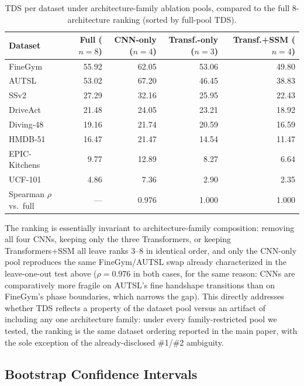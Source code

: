 \documentclass[a4paper, 10pt, conference, onecolumn]{ieeeconf}
\newcommand{\tabtight}{\setlength{\tabcolsep}{3.5pt}\renewcommand{\arraystretch}{1.12}}
\newcommand{\TDS}{\textsc{TDS}}
\begin{document}
\begin{table}[!htbp]
\centering
\caption{\TDS{} per dataset under architecture-family ablation pools, compared to the full 8-architecture ranking (sorted by full-pool \TDS{}).}
\label{tab:family_ablation}
\scriptsize\tabtight
\begin{tabular}{l r r r r}
\toprule
Dataset & Full ($n{=}8$) & CNN-only ($n{=}4$) & Transf.-only ($n{=}3$) & Transf.+SSM ($n{=}4$) \\
\midrule
FineGym       & 55.92 & 62.05 & 53.06 & 49.80 \\
AUTSL         & 53.02 & 67.20 & 46.45 & 38.83 \\
SSv2          & 27.29 & 32.16 & 25.95 & 22.43 \\
DriveAct      & 21.48 & 24.05 & 23.21 & 18.92 \\
Diving-48     & 19.16 & 21.74 & 20.59 & 16.59 \\
HMDB-51       & 16.47 & 21.47 & 14.54 & 11.47 \\
EPIC-Kitchens &  9.77 & 12.89 &  8.27 &  6.64 \\
UCF-101       &  4.86 &  7.36 &  2.90 &  2.35 \\
\midrule
Spearman $\rho$ vs.\ full & --- & 0.976 & 1.000 & 1.000 \\
\bottomrule
\end{tabular}
\end{table}

The ranking is essentially invariant to architecture-family composition: removing all four CNNs, keeping only the three Transformers, or keeping Transformers+SSM all leave ranks 3--8 in identical order, and only the CNN-only pool reproduces the same FineGym/AUTSL swap already characterized in the leave-one-out test above ($\rho=0.976$ in both cases, for the same reason: CNNs are comparatively more fragile on AUTSL's fine handshape transitions than on FineGym's phase boundaries, which narrows the gap). This directly addresses whether \TDS{} reflects a property of the dataset pool versus an artifact of including any one architecture family: under every family-restricted pool we tested, the ranking is the same dataset ordering reported in the main paper, with the sole exception of the already-disclosed \#1/\#2 ambiguity.

\subsection{Bootstrap Confidence Intervals}
\label{sec:sup_bootstrap}
\end{document}
